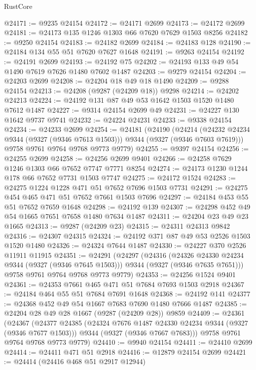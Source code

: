 \begin{lexlean}{RustCore}
\begin{coremodule}
@24171 := @9235 @24154
@24172 := @24171 @2699
@24173 := @24172 @2699
@24181 := @24173 @135 @1246 @1303 @66 @7620 @7629 @1503 @8256
@24182 := @9250 @24154
@24183 := @24182 @2699
@24184 := @24183 @128
@24190 := @24184 @134 @55 @51 @7620 @7627 @1648
@24191 := @9263 @24154
@24192 := @24191 @2699
@24193 := @24192 @75
@24202 := @24193 @133 @49 @54 @1490 @7619 @7626 @1480 @7602 @1487
@24203 := @9279 @24154
@24204 := @24203 @2699
@24208 := @24204 @18 @49 @18 @1490
@24209 := @9288 @24154
@24213 := @24208 (@9287 (@24209 @18)) @9298
@24214 := @24202 @24213
@24224 := @24192 @131 @87 @49 @53 @1642 @1503 @1520 @1480 @7612 @1487
@24227 := @9314 @24154 @2699 @49
@24231 := @24227 @130 @1642 @9737 @9741
@24232 := @24224 @24231
@24233 := @9338 @24154
@24234 := @24233 @2699
@24254 := @24181
    (@24190
      (@24214 (@24232 @24234 @9344 (@9327 (@9346 @7613 @1503))) @9344 (@9327 (@9346 @7603 @7619)))
      @9758
      @9761
      @9764
      @9768
      @9773
      @9779)
@24255 := @9397 @24154
@24256 := @24255 @2699
@24258 := @24256 @2699 @9401
@24266 := @24258 @7629 @1246 @1303 @66 @7652 @7747 @7771 @8254
@24274 := @24173 @1230 @1244 @178 @66 @7652 @7731 @1503 @7747
@24275 := @24172 @1524
@24283 := @24275 @1224 @1228 @471 @51 @7652 @7696 @1503 @7731
@24291 := @24275 @454 @465 @471 @51 @7652 @7661 @1503 @7696
@24297 := @24184 @453 @55 @51 @7652 @7659 @1648
@24298 := @24192 @139
@24307 := @24298 @452 @49 @54 @1665 @7651 @7658 @1480 @7634 @1487
@24311 := @24204 @23 @49 @23 @1665
@24313 := @9287 (@24209 @23)
@24315 := @24311 @24313 @9842
@24316 := @24307 @24315
@24324 := @24192 @371 @87 @49 @53 @2526 @1503 @1520 @1480
@24326 := @24324 @7644 @1487
@24330 := @24227 @370 @2526 @11911 @11915
@24351 := @24291
    (@24297
      (@24316
        (@24326 @24330 @24234 @9344 (@9327 (@9346 @7645 @1503)))
        @9344
        (@9327 (@9346 @7635 @7651)))
      @9758
      @9761
      @9764
      @9768
      @9773
      @9779)
@24353 := @24256 @1524 @9401
@24361 := @24353 @7661 @465 @471 @51 @7684 @7693 @1503 @2918
@24367 := @24184 @464 @55 @51 @7684 @7691 @1648
@24368 := @24192 @141
@24377 := @24368 @452 @49 @54 @1667 @7683 @7690 @1480 @7666 @1487
@24385 := @24204 @28 @49 @28 @1667 (@9287 (@24209 @28)) @9859
@24409 := @24361
    (@24367
      (@24377
        @24385
        (@24324 @7676 @1487 @24330 @24234 @9344 (@9327 (@9346 @7677 @1503)))
        @9344
        (@9327 (@9346 @7667 @7683)))
      @9758
      @9761
      @9764
      @9768
      @9773
      @9779)
@24410 := @9940 @24154
@24411 := @24410 @2699
@24414 := @24411 @471 @51 @2918
@24416 := @12879 @24154 @2699
@24421 := @24414 (@24416 @468 @51 @2917 @12944)

\end{coremodule}
\end{lexlean}
